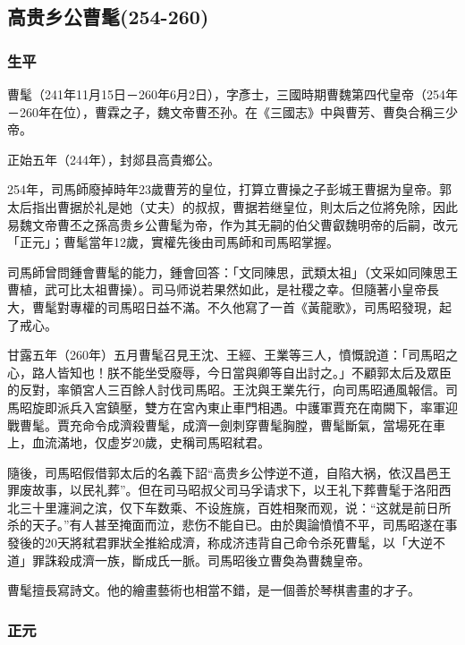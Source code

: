 
\subsection{高贵乡公曹髦\tiny(254-260)}

\subsubsection{生平}

曹髦（241年11月15日－260年6月2日），字彥士，三國時期曹魏第四代皇帝（254年－260年在位），曹霖之子，魏文帝曹丕孙。在《三國志》中與曹芳、曹奐合稱三少帝。

正始五年（244年），封郯县高貴鄉公。

254年，司馬師廢掉時年23歲曹芳的皇位，打算立曹操之子彭城王曹据为皇帝。郭太后指出曹据於礼是她（丈夫）的叔叔，曹据若继皇位，則太后之位將免除，因此易魏文帝曹丕之孫高贵乡公曹髦为帝，作为其无嗣的伯父曹叡魏明帝的后嗣，改元「正元」；曹髦當年12歲，實權先後由司馬師和司馬昭掌握。

司馬師曾問鍾會曹髦的能力，鍾會回答：「文同陳思，武類太祖」（文采如同陳思王曹植，武可比太祖曹操）。司马师说若果然如此，是社稷之幸。但隨著小皇帝長大，曹髦對專權的司馬昭日益不滿。不久他寫了一首《黃龍歌》，司馬昭發現，起了戒心。

甘露五年（260年）五月曹髦召見王沈、王經、王業等三人，憤慨說道：「司馬昭之心，路人皆知也！朕不能坐受廢辱，今日當與卿等自出討之。」不顧郭太后及眾臣的反對，率領宮人三百餘人討伐司馬昭。王沈與王業先行，向司馬昭通風報信。司馬昭旋即派兵入宮鎮壓，雙方在宮內東止車門相遇。中護軍賈充在南闕下，率軍迎戰曹髦。賈充命令成濟殺曹髦，成濟一劍刺穿曹髦胸膛，曹髦斷氣，當場死在車上，血流滿地，仅虚岁20歲，史稱司馬昭弒君。

隨後，司馬昭假借郭太后的名義下詔“高贵乡公悖逆不道，自陷大祸，依汉昌邑王罪废故事，以民礼葬”。但在司马昭叔父司马孚请求下，以王礼下葬曹髦于洛阳西北三十里瀍涧之滨，仅下车数乘、不设旌旐，百姓相聚而观，说：“这就是前日所杀的天子。”有人甚至掩面而泣，悲伤不能自已。由於輿論憤憤不平，司馬昭遂在事發後的20天將弒君罪狀全推給成濟，称成济违背自己命令杀死曹髦，以「大逆不道」罪誅殺成濟一族，斷成氏一脈。司馬昭後立曹奐為曹魏皇帝。

曹髦擅長寫詩文。他的繪畫藝術也相當不錯，是一個善於琴棋書畫的才子。


\subsubsection{正元}

